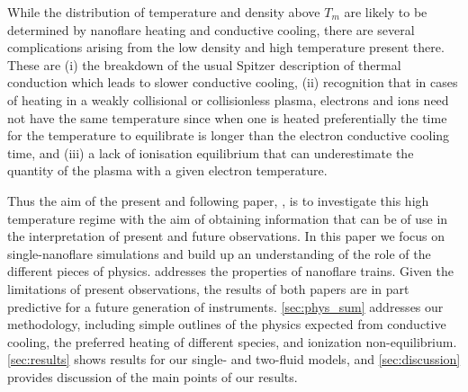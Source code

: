 \documentclass[apj]{emulateapj}
\begin{document}
%
	\par While the distribution of temperature and density above $T_m$ are likely to be determined by nanoflare heating and conductive cooling, there are several complications arising from the low density and high temperature present there. These are (i) the breakdown of the usual Spitzer description of thermal conduction which leads to slower conductive cooling, (ii) recognition that in cases of heating in a weakly collisional or collisionless plasma, electrons and ions need not have the same temperature since when one is heated preferentially the time for the temperature to equilibrate is longer than the electron conductive cooling time, and (iii) a lack of ionisation equilibrium that can underestimate the quantity of the plasma with a given electron temperature.
%
	\par Thus the aim of the present and following paper, \citet[in preparation]{barnes_inference_2016-1} , is to investigate this high temperature regime with the aim of obtaining information that can be of use in the interpretation of present and future observations. In this paper we focus on single-nanoflare simulations and build up an understanding of the role of the different pieces of physics.  addresses the properties of nanoflare trains. Given the limitations of present observations, the results of both papers are in part predictive for a future generation of instruments. \autoref{sec:phys_sum} addresses our methodology, including simple outlines of the physics expected from conductive cooling, the preferred heating of different species, and ionization non-equilibrium. \autoref{sec:results} shows results for our single- and two-fluid models, and \autoref{sec:discussion} provides discussion of the main points of our results.
\end{document}

